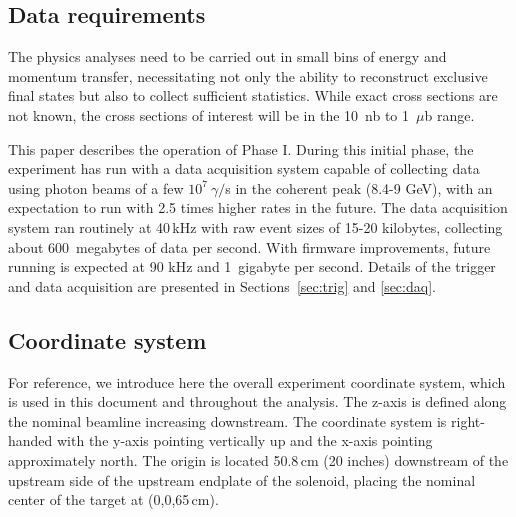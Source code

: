 \subsection{Data requirements \label{sec:intro:data_requirements}}
The physics analyses need to be carried out in small bins of energy and momentum transfer, necessitating not only the ability to reconstruct exclusive final states but also to collect sufficient statistics. 
While exact cross sections are not known, the cross sections of interest will be in the 10~nb to 1~$\mu$b range. 

This paper describes the operation of \gx{} Phase I.
During this initial phase, the \GX{} experiment has run with a data acquisition system capable of collecting data using photon beams of a few $10^{7}~\gamma/$s in the coherent peak (8.4-9 GeV), with an expectation to run with 2.5 times higher rates in the future. %
The data acquisition system ran routinely at 40\,kHz with raw event sizes of 15-20 kilobytes, collecting about 600~megabytes of data per second. With firmware improvements, future running is expected at 90 kHz and 1~gigabyte per second. Details of the trigger and data acquisition are presented in Sections~\ref{sec:trig} and \ref{sec:daq}.

\subsection{Coordinate system \label{sec:intro:coordinates}}
For reference, we introduce here the overall experiment coordinate system, which is used in this document and throughout the analysis. The z-axis is defined along the nominal beamline increasing downstream. The coordinate system 
is right-handed with the y-axis pointing vertically up and the x-axis pointing approximately north. 
The origin is located 50.8\,cm (20 inches) downstream of the upstream side of the upstream endplate of the solenoid, placing the nominal center of the target at (0,0,65\,cm).
